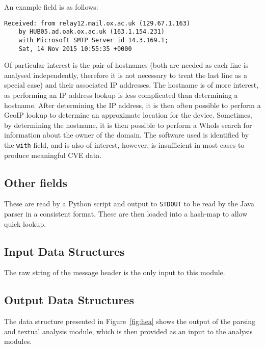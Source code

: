 An example field is as follows:
\begin{verbatim}
Received: from relay12.mail.ox.ac.uk (129.67.1.163)
    by HUB05.ad.oak.ox.ac.uk (163.1.154.231)
    with Microsoft SMTP Server id 14.3.169.1;
    Sat, 14 Nov 2015 10:55:35 +0000
\end{verbatim}

Of particular interest is the pair of hostnames (both are needed as each line is analysed independently, therefore it is not necessary to treat the last line as a special case) and their associated IP addresses.  The hostname is of more interest, as performing an IP address lookup is less complicated than determining a hostname.  After determining the IP address, it is then often possible to perform a GeoIP lookup to determine an approximate location for the device. Sometimes, by determining the hostname, it is then possible to perform a WhoIs search for information about the owner of the domain. The software used is identified by the \texttt{with} field, and is also of interest, however, is insufficient in most cases to produce meaningful CVE data.

\subsection{Other fields}

These are read by a Python script and output to \texttt{STDOUT} to be read by
the Java parser in a consistent format.  These are then loaded into a hash-map to
allow quick lookup.


\subsection{Input Data Structures}
The raw string of the message header is the only input to this module.

\subsection{Output Data Structures}
The data structure presented in Figure~\ref{fig:hea} shows the output of the
parsing and textual analysis module, which is then provided as an input to the
analysis modules.

